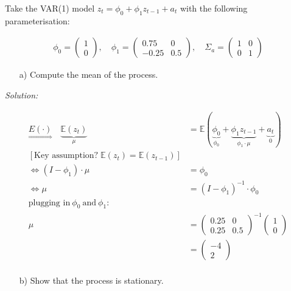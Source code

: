 \documentclass[12pt,a4paper]{article}
\begin{document}
Take the VAR(1) model \(z_t = \phi_0 + \phi_1 z_{t-1} + a_t\) with the
following parameterisation:

\begin{align*}
    \phi_0 = \begin{pmatrix} 1 \\ 0 \end{pmatrix}, \quad \phi_1 = \begin{pmatrix} 0.75 & 0 \\ -0.25 & 0.5 \end{pmatrix}, \quad \Sigma_a = \begin{pmatrix} 1 & 0 \\ 0 & 1 \end{pmatrix}
\end{align*}

\begin{itemize}
    \item[a)] Compute the mean of the process.
\end{itemize}

\emph{Solution:}

\begin{align*}
  \underset{\Rightarrow}{E(\cdot)} \quad \underbrace{ \mathbb{E} (z_t)}_{\mu} & = \mathbb{E} \left(  \underbrace{\phi_0}_{\phi_0} + \underbrace{\phi_1 z_{t -1}}_{\phi_1 \cdot \mu}+ \underbrace{a_t}_{0}\right)\\
  \left[ \text{Key assumption?} \;  \mathbb{E} (z_t)  = \mathbb{E} (z_{t-1}) \right]\\
  \Leftrightarrow \left( I - \phi_1 \right) \cdot \mu & = \phi_0\\
  \Leftrightarrow \mu & = \left( I - \phi_1 \right)^{-1} \cdot \phi_0\\
  \text{plugging in} \ \phi_0 \ \text{and} \ \phi_1:\\
  \mu & = \begin{pmatrix} 
  0.25 & 0 \\
  0.25 & 0.5
  \end{pmatrix}^{-1} 
  \begin{pmatrix} 
  1 \\
  0
  \end{pmatrix}\\
  & = 
  \begin{pmatrix} 
  -4 \\
  2
  \end{pmatrix}\\
\end{align*}

\begin{itemize}
    \item[b)] Show that the process is stationary.
\end{itemize}
\end{document}
